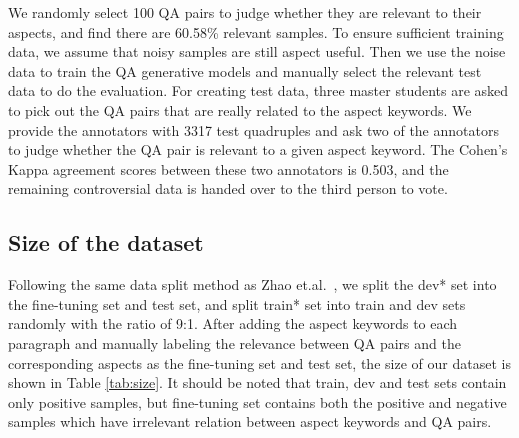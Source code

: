 We randomly select 100 QA pairs to judge whether they are relevant to their aspects, and find there are 60.58\% relevant samples.
To ensure sufficient training data,
we assume that noisy samples are still aspect useful.
Then we use the noise data to train the QA generative models and manually select the relevant test data to do the evaluation.
For creating test data, three master students are asked to 
pick out the QA pairs that are really related to the aspect keywords.
We provide the annotators with 3317 test quadruples and ask two of the annotators to judge whether the QA pair is relevant to a given aspect keyword.
The Cohen's Kappa agreement scores between these two annotators is 0.503, and the remaining controversial data is handed over to the third person to vote.

\subsection{Size of the dataset}
Following the same data split method as Zhao et.al.~,  we split the dev* set into the fine-tuning set and test set, and split train* set into train and dev sets randomly with the ratio of 9:1.
After adding the aspect keywords to each paragraph and manually labeling the relevance between QA pairs and the corresponding aspects as the fine-tuning set and test set, the size of our dataset is shown in Table \ref{tab:size}.
It should be noted that train, dev and test sets contain only positive samples, but fine-tuning set contains both the positive and negative samples which have irrelevant relation between aspect keywords and QA pairs.

